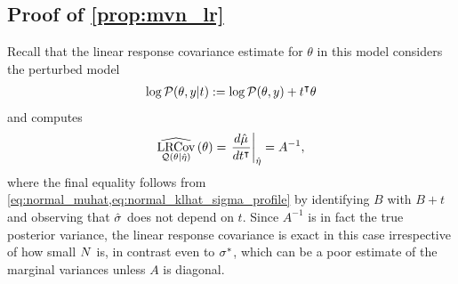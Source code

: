 \subsection{Proof of \cref{prop:mvn_lr}}\label{app:mvn_lr_proof}
%
Recall that the linear response covariance estimate for $\theta$ in this model
considers the perturbed model
%
\begin{align*}
%
\log \p(\theta, \y | t) := \log \p(\theta, \y) + t^\trans \theta
%
\end{align*}
%
and computes
%
\begin{align*}
%
\lrcov{\q(\theta \vert \etahat)}{\theta} =
\fracat{d \etamuhat}{d t^\trans}{\etahat} = A^{-1},
%
\end{align*}
%
where the final equality follows from
\cref{eq:normal_muhat,eq:normal_klhat_sigma_profile} by identifying $B$ with $B
+ t$ and observing that $\hat{\sigma}_{}$ does not depend on $t$.  Since $A^{-1}$
is in fact the true posterior variance, the linear response covariance is exact
in this case irrespective of how small $N$ is, in contrast even to
$\sigma_{}^{*}$, which can be a poor estimate of the marginal variances unless
$A$ is diagonal.

